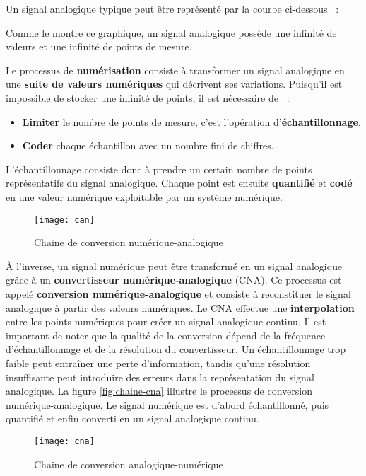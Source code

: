 Un signal analogique typique peut être représenté par la courbe ci-dessous ~:

\begin{center}
\end{center}

Comme le montre ce graphique, un signal analogique possède une infinité de 
valeurs et une infinité de points de mesure.


Le processus de \textbf{numérisation} consiste à transformer un signal analogique 
en une \textbf{suite de valeurs numériques} qui décrivent ses variations. 
Puisqu'il est impossible de stocker une infinité de points, il est nécessaire de ~:
\begin{itemize}
    \item \textbf{Limiter} le nombre de points de mesure, c'est l’opération d’\textbf{échantillonnage}.
    \item \textbf{Coder} chaque échantillon avec un nombre fini de chiffres.
\end{itemize}


L’échantillonnage consiste donc à prendre un certain nombre de points 
représentatifs du signal analogique. Chaque point est ensuite \textbf{quantifié} 
et \textbf{codé} en une valeur numérique exploitable par un système numérique.
\begin{figure}[H]
    \centering
    \texttt{[image: can]}
    \caption{Chaine de conversion numérique-analogique}
    \label{figCna}
\end{figure}

\`A l’inverse, un signal numérique peut être transformé en un signal analogique 
grâce à un \textbf{convertisseur numérique-analogique} (CNA). Ce processus est
appelé \textbf{conversion numérique-analogique} et consiste à reconstituer le
signal analogique à partir des valeurs numériques. Le CNA effectue une
\textbf{interpolation} entre les points numériques pour créer un signal analogique
continu. Il est important de noter que la qualité de la conversion dépend de la
fréquence d'échantillonnage et de la résolution du convertisseur. Un échantillonnage
trop faible peut entraîner une perte d'information, tandis qu'une résolution
insuffisante peut introduire des erreurs dans la représentation du signal
analogique. La figure \ref{fig:chaine-cna} illustre le processus de conversion
numérique-analogique. Le signal numérique est d'abord échantillonné, puis
quantifié et enfin converti en un signal analogique continu.
\begin{figure}[H]
    \centering
    \texttt{[image: cna]}
    \caption{Chaine de conversion analogique-numérique}
    \label{figChaineCna}
\end{figure}

